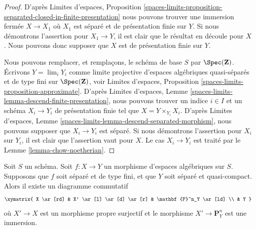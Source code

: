 \begin{proof}
D'après
Limites d'espaces, Proposition
\ref{spaces-limits-proposition-separated-closed-in-finite-presentation}
nous pouvons trouver une immersion fermée $X \to X_1$ où $X_1$ est séparé
et de présentation finie sur $Y$. Si nous démontrons l'assertion
pour $X_1 \to Y$, il est clair que le résultat en découle pour $X$. Nous pouvons donc supposer que
$X$ est de présentation finie sur $Y$.

\medskip\noindent
Nous pouvons remplacer, et remplaçons, le schéma de base $S$ par $\Spec(\mathbf{Z})$.
Écrivons $Y = \lim_i Y_i$ comme limite projective d'espaces algébriques
quasi-séparés et de type fini sur $\Spec(\mathbf{Z})$, voir
Limites d'espaces,
Proposition \ref{spaces-limits-proposition-approximate}.
D'après
Limites d'espaces,
Lemme \ref{spaces-limits-lemma-descend-finite-presentation},
nous pouvons
trouver un indice $i \in I$ et un schéma $X_i \to Y_i$ de présentation finie
tel que $X = Y \times_{Y_i} X_i$.
D'après
Limites d'espaces,
Lemme \ref{spaces-limits-lemma-descend-separated-morphism},
nous pouvons supposer que $X_i \to Y_i$ est séparé.
Si nous démontrons l'assertion pour
$X_i$ sur $Y_i$, il est clair que l'assertion vaut pour $X$. Le cas
$X_i \to Y_i$ est traité par le
Lemme \ref{lemma-chow-noetherian}.
\end{proof}

\begin{lemma}
\label{lemma-chow-finite-type-separated}
Soit $S$ un schéma. Soit $f : X \to Y$ un morphisme d'espaces algébriques
sur $S$. Supposons que $f$ soit séparé et de type fini, et que $Y$ soit séparé et
quasi-compact. Alors il existe un diagramme commutatif
$$
\xymatrix{
X \ar[rd] & X' \ar[l] \ar[d] \ar[r] & \mathbf{P}^n_Y \ar[ld] \\
& Y
}
$$
où $X' \to X$ est un morphisme propre surjectif
et le morphisme $X' \to \mathbf{P}^n_Y$ est une immersion.
\end{lemma}

